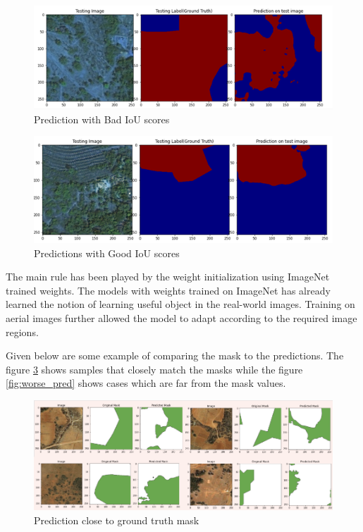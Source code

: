\documentclass[rnd]{mas_proposal}
\begin{document}
\begin{figure}[htp] 
        \centering
        \includegraphics[width=1.2\textwidth]{images/fig12.png}
        \caption{ Prediction with Bad IoU scores}%
        \label{fig: Prediction with Bad IoU scores}%
\end{figure}

\begin{figure}[htp] 
        \centering
        \includegraphics[width=1.2\textwidth]{images/fig13.png}
        \caption{ Predictions with Good  IoU scores}%
        \label{fig: Predictions with Good  IoU scores}%
\end{figure}


\vspace{20px}


The main rule has been played by the weight initialization using ImageNet trained weights. The models with weights trained on ImageNet has already learned the 
notion of learning useful object in the real-world images. Training on aerial images further allowed the model to adapt according to the required image regions. 

Given below are some example of comparing the mask to the predictions. The figure \ref{fig:better_pred} shows samples that closely match the masks while the 
figure \ref{fig:worse_pred} shows cases which are far from the mask values.


\begin{figure}[htp] 
        \centering
        \includegraphics[width=1.2\textwidth]{images/fig15_better_pred.png}
        \caption{Prediction close to ground truth mask}%
        \label{fig:better_pred}%
\end{figure}
\end{document}
